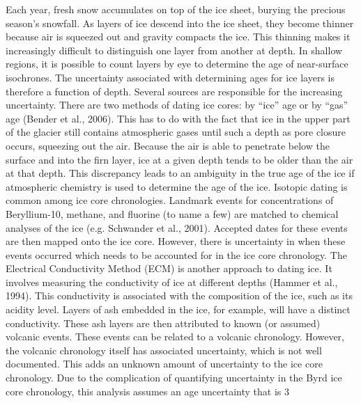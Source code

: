 \documentclass[draft,jgrga]{agutex}
\begin{document}
	Each year, fresh snow accumulates on top of the ice sheet, burying the precious season’s snowfall. As layers of ice descend into the ice sheet, they become thinner because air is squeezed out and gravity compacts the ice. This thinning makes it increasingly difficult to distinguish one layer from another at depth. In shallow regions, it is possible to count layers by eye to determine the age of near-surface isochrones.
	The uncertainty associated with determining ages for ice layers is therefore a function of depth. Several sources are responsible for the increasing uncertainty. There are two methods of dating ice cores: by “ice” age or by “gas” age (Bender et al., 2006). This has to do with the fact that ice in the upper part of the glacier still contains atmospheric gases until such a depth as pore closure occurs, squeezing out the air. Because the air is able to penetrate below the surface and into the firn layer, ice at a given depth tends to be older than the air at that depth. This discrepancy leads to an ambiguity in the true age of the ice if atmospheric chemistry is used to determine the age of the ice. Isotopic dating is common among ice core chronologies. Landmark events for concentrations of Beryllium-10, methane, and fluorine (to name a few) are matched to chemical analyses of the ice (e.g. Schwander et al., 2001). Accepted dates for these events are then mapped onto the ice core. However, there is uncertainty in when these events occurred which needs to be accounted for in the ice core chronology.
	The Electrical Conductivity Method (ECM) is another approach to dating ice. It involves measuring the conductivity of ice at different depths (Hammer et al., 1994). This conductivity is associated with the composition of the ice, such as its acidity level. Layers of ash embedded in the ice, for example, will have a distinct conductivity. These ash layers are then attributed to known (or assumed) volcanic events. These events can be related to a volcanic chronology.  However, the volcanic chronology itself has associated uncertainty, which is not well documented. This adds an unknown amount of uncertainty to the ice core chronology.
	Due to the complication of quantifying uncertainty in the Byrd ice core chronology, this analysis assumes an age uncertainty that is 3%
\end{document}
